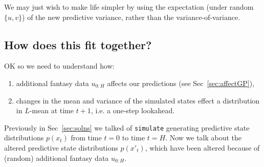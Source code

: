 \documentclass[a4paper,10pt]{article}
\begin{document}
We may just wish to make life simpler by using the expectation (under random $\{u,v\}$)
of the new predictive variance, rather than the variance-of-variance.

\subsection{How does this fit together?}

OK so we need to understand how:
\begin{enumerate}
 \item additional fantasy data $u_{0:H}$ affects our predictions (see Sec~\ref{sec:affectGP}),
 \item changes in the mean and variance of the simulated states effect a distribution in $L$-mean
 at time $t+1$, i.e. a one-step lookahead.
\end{enumerate}

Previously in Sec~\ref{sec:solns} we talked of {\tt simulate} generating predictive state distributions
$p(x_t)$ from time $t=0$ to time $t=H$.
Now we talk about the altered predictive state distributions $p(x'_t)$,
which have been altered because of (random) additional fantasy data $u_{0:H}$.
\end{document}
